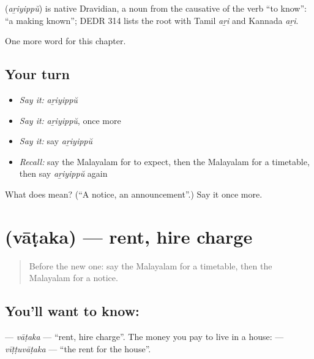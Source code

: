 \begin{cousinweb}
\textbf{} (\emph{aṟiyippŭ}) is native Dravidian, a noun from the causative of the verb \textquotedblleft{}to know\textquotedblright{}: \textquotedblleft{}a making known\textquotedblright{}; DEDR 314 lists the root with Tamil \emph{aṟi} and Kannada \emph{aṟi}.
\end{cousinweb}

\begin{grammarlens}[title={What you've built}]
One more word for this chapter.
\end{grammarlens}

\subsection*{Your turn}
\begin{itemize}
\raggedright
  \item \emph{Say it:} \emph{aṟiyippŭ}
  \item \emph{Say it:} \emph{aṟiyippŭ}, once more
  \item \emph{Say it:} say \emph{aṟiyippŭ}
  \item \emph{Recall:} say the Malayalam for to expect, then the Malayalam for a timetable, then say \emph{aṟiyippŭ} again
\end{itemize}

\begin{tcolorbox}[breakable,colback=teal!4,colframe=teal!35!black,title={Before you move on}]
What does  mean? (\textquotedblleft{}A notice, an announcement\textquotedblright{}.) Say it once more.
\end{tcolorbox}
\section[\texorpdfstring{\ml{വാടക} (vāṭaka)}{വാടക (vāṭaka)}]{ (vāṭaka) — rent, hire charge}

\label{lesson:ML-C180-vataka}



\begin{quote}
Before the new one: say the Malayalam for a timetable, then the Malayalam for a notice.
\end{quote}

\subsection*{You'll want to know: }
\textbf{} — \emph{vāṭaka} — \textquotedblleft{}rent, hire charge\textquotedblright{}. The money you pay to live in a house: \textbf{} — \emph{vīṭṭuvāṭaka} — \textquotedblleft{}the rent for the house\textquotedblright{}.

